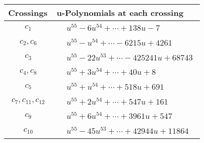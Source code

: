 \documentclass[1p]{elsarticle_modified}
\theoremstyle{definition}
\begin{document}
\begin{tabular}{m{50pt}|m{274pt}}
Crossings & \hspace{64pt}u-Polynomials at each crossing \\
\hline $$\begin{aligned}c_{1}\end{aligned}$$&$\begin{aligned}
&u^{55}-6 u^{54}+\cdots+138 u-7
\end{aligned}$\\
\hline $$\begin{aligned}c_{2},c_{6}\end{aligned}$$&$\begin{aligned}
&u^{55}- u^{54}+\cdots-6215 u+4261
\end{aligned}$\\
\hline $$\begin{aligned}c_{3}\end{aligned}$$&$\begin{aligned}
&u^{55}-22 u^{53}+\cdots-425241 u+68743
\end{aligned}$\\
\hline $$\begin{aligned}c_{4},c_{8}\end{aligned}$$&$\begin{aligned}
&u^{55}+3 u^{54}+\cdots+40 u+8
\end{aligned}$\\
\hline $$\begin{aligned}c_{5}\end{aligned}$$&$\begin{aligned}
&u^{55}+u^{54}+\cdots+518 u+691
\end{aligned}$\\
\hline $$\begin{aligned}c_{7},c_{11},c_{12}\end{aligned}$$&$\begin{aligned}
&u^{55}+2 u^{54}+\cdots+547 u+161
\end{aligned}$\\
\hline $$\begin{aligned}c_{9}\end{aligned}$$&$\begin{aligned}
&u^{55}+6 u^{54}+\cdots+3961 u+547
\end{aligned}$\\
\hline $$\begin{aligned}c_{10}\end{aligned}$$&$\begin{aligned}
&u^{55}-45 u^{53}+\cdots+42944 u+11864
\end{aligned}$\\
\hline
\end{tabular}\\~\\
\end{document}
